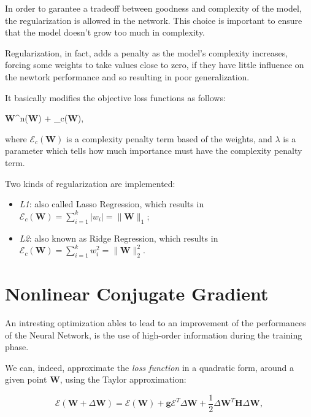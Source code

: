 			In order to garantee a tradeoff between goodness and complexity of the model, the regularization is allowed in the network. This choice is important to ensure that the model doesn't grow too much in complexity. 

			Regularization, in fact, adds a penalty as the model's complexity increases, forcing some weights to take values close to zero,  if they have little influence on the newtork performance and so resulting in poor generalization.

			It basically modifies the objective loss functions as follows:
			
			\begin{mini}
			  {\textbf{W}\in {}^n}{(\textbf{W}) + \lambda{}_c(\textbf{W}),}{}{}
			\end{mini}

			where $\mathcal{E}_c(\textbf{W})$ is a complexity penalty term based of the weights, and $\lambda$ is a parameter which tells how much importance must have the complexity penalty term.

			Two kinds of regularization are implemented:

			\begin{itemize}
				\item \textit{L1}: also called Lasso Regression, which results in $\mathcal{E}_c(\textbf{W}) = \sum_{i=1}^{k} |w_i| = \|\textbf{W}\|_1$;
				\item \textit{L2}: also known as Ridge Regression, which results in $\mathcal{E}_c(\textbf{W}) = \sum_{i=1}^{k}w_i^2 = \|\textbf{W}\|_2^2$.
			\end{itemize}




	\section{Nonlinear Conjugate Gradient} %
	\label{sec:nonlinear_conjugate_gradient}

		An intresting optimization ables to lead to an improvement of the performances of the Neural Network, is the use of high-order information during the training phase.

		We can, indeed, approximate the \textit{loss function} in a quadratic form, around a given point \textbf{W}, using the Taylor approximation:

		 \begin{equation}
		 	\label{quadratic}
		    \mathcal{E}(\textbf{W} + \Delta\textbf{W}) = \mathcal{E}(\textbf{W})+\textbf{g}\mathcal{E}^T\Delta\textbf{W}+ \frac{1}{2}\Delta\textbf{W}^T\textbf{H}\Delta\textbf{W},
		 \end{equation}

